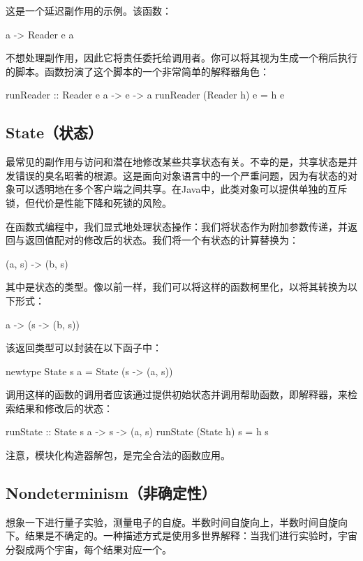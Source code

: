 \documentclass[DaoFP]{subfiles}
\begin{document}
    这是一个延迟副作用的示例。该函数：
    \begin{haskell}
        a -> Reader e a
    \end{haskell}
    不想处理副作用，因此它将责任委托给调用者。你可以将其视为生成一个稍后执行的脚本。函数扮演了这个脚本的一个非常简单的解释器角色：
    \begin{haskell}
        runReader :: Reader e a -> e -> a
        runReader (Reader h) e = h e
    \end{haskell}

    \subsection{State（状态）}

    最常见的副作用与访问和潜在地修改某些共享状态有关。不幸的是，共享状态是并发错误的臭名昭著的根源。这是面向对象语言中的一个严重问题，因为有状态的对象可以透明地在多个客户端之间共享。在Java中，此类对象可以提供单独的互斥锁，但代价是性能下降和死锁的风险。

    在函数式编程中，我们显式地处理状态操作：我们将状态作为附加参数传递，并返回与返回值配对的修改后的状态。我们将一个有状态的计算替换为：
    \begin{haskell}
    (a, s) -> (b, s)
    \end{haskell}
    其中是状态的类型。像以前一样，我们可以将这样的函数柯里化，以将其转换为以下形式：
    \begin{haskell}
        a -> (s -> (b, s))
    \end{haskell}
    该返回类型可以封装在以下函子中：
    \begin{haskell}
        newtype State s a = State (s -> (a, s))
    \end{haskell}
    调用这样的函数的调用者应该通过提供初始状态并调用帮助函数，即解释器，来检索结果和修改后的状态：
    \begin{haskell}
        runState :: State s a -> s -> (a, s)
        runState (State h) s = h s
    \end{haskell}
    注意，模块化构造器解包，是完全合法的函数应用。

    \subsection{Nondeterminism（非确定性）}

    想象一下进行量子实验，测量电子的自旋。半数时间自旋向上，半数时间自旋向下。结果是不确定的。一种描述方式是使用多世界解释：当我们进行实验时，宇宙分裂成两个宇宙，每个结果对应一个。
\end{document}
